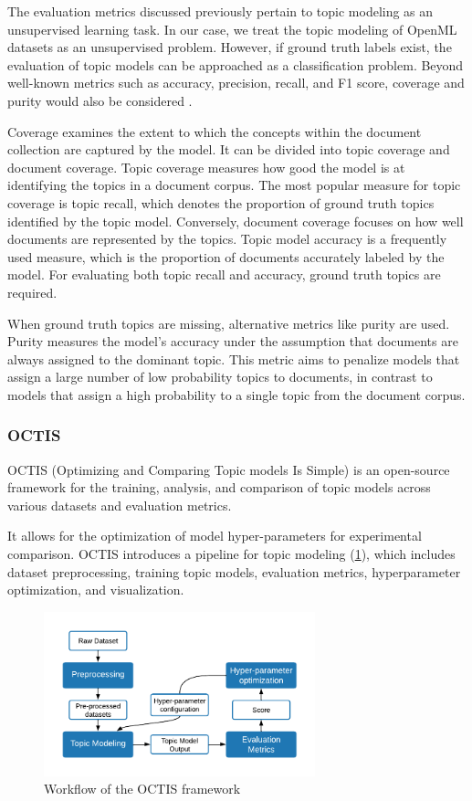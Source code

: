 The evaluation metrics discussed previously pertain to topic modeling as an unsupervised learning task. In our case, we treat the topic modeling of OpenML datasets as an unsupervised problem. However, if ground truth labels exist, the evaluation of topic models can be approached as a classification problem. Beyond well-known metrics such as accuracy, precision, recall, and F1 score, coverage and purity would also be considered \cite{churchill_evolution_2022}.

Coverage examines the extent to which the concepts within the document collection are captured by the model. It can be divided into topic coverage and document coverage. Topic coverage measures how good the model is at identifying the topics in a document corpus. The most popular measure for topic coverage is topic recall, which denotes the proportion of ground truth topics identified by the topic model. Conversely, document coverage focuses on how well documents are represented by the topics. Topic model accuracy is a frequently used measure, which is the proportion of documents accurately labeled by the model. For evaluating both topic recall and accuracy, ground truth topics are required.

When ground truth topics are missing, alternative metrics like purity are used. Purity measures the model's accuracy under the assumption that documents are always assigned to the dominant topic. This metric aims to penalize models that assign a large number of low probability topics to documents, in contrast to models that assign a high probability to a single topic from the document corpus.

\subsubsection{OCTIS}

OCTIS (Optimizing and Comparing Topic models Is Simple) \cite{terragni_octis_2021} is an open-source framework for the training, analysis, and comparison of topic models across various datasets and evaluation metrics.

It allows for the optimization of model hyper-parameters for experimental comparison. OCTIS introduces a pipeline for topic modeling (\cref{fig:octis}), which includes dataset preprocessing, training topic models, evaluation metrics, hyperparameter optimization, and visualization.

\begin{figure}[h] %
    \centering
    \includegraphics[width=0.7\textwidth]{figures/octis.pdf}
    \caption{Workflow of the OCTIS framework}
    \label{fig:octis}
\end{figure}

